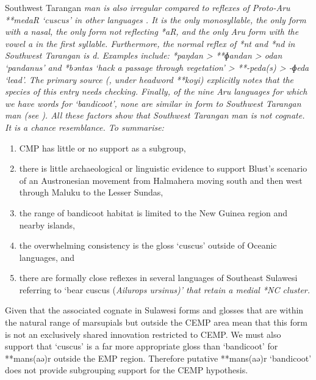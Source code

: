 Southwest Tarangan \it{man} is also irregular compared to reflexes
of Proto-Aru **medaR ‘cuscus’ in other  languages \citep[264]{Schapper2011}.
It is the only monosyllable,
the only form with a nasal,
the only form not reflecting *aR,
and the only Aru form with the vowel \it{a} in the first syllable.
Furthermore, the normal reflex of *nt and *nd in Southwest Tarangan is \it{d}.
Examples include: *paŋdan > **ɸandan > \it{odan} `pandanus' and
*bəntas `hack a passage through vegetation' > **-peda(s) > \it{-ɸeda} `lead'.
The primary source (\citealt{Nivens2017},
under headword **koyi) explicitly notes that the species of this entry needs checking.
Finally, of the nine Aru languages for which we have words
for ‘bandicoot’, none are similar in form to Southwest Tarangan \it{man} (see
).
All these factors show that Southwest Tarangan \it{man} is not cognate.
It is a chance resemblance.
To summarise:

\begin{enumerate}
	\item	CMP has little or no support as a subgroup,
	\item	there is little archaeological or linguistic evidence to
				support Blust’s scenario of an Austronesian movement from Halmahera
				moving south and then west through Maluku to the Lesser Sundas,
	\item	the range of bandicoot habitat is limited to the New Guinea
				region and nearby islands,
	\item	the overwhelming consistency is the
				gloss ‘cuscus’
				outside of Oceanic languages, and
	\item	there are formally close reflexes in several
				languages of Southeast Sulawesi referring to ‘bear cuscus (\it{Ailurops
				ursinus})’ that retain a medial *NC cluster.
\end{enumerate}

Given that the associated cognate in Sulawesi forms
and glosses that are within the natural range of marsupials but
outside the CEMP area mean that this form is not an exclusively
shared innovation restricted to CEMP.
We must also support \citet{Schapper2011} that ‘cuscus’ is a far
more appropriate gloss than ‘bandicoot’ for **mans(aə)r outside
the EMP region.
Therefore putative **mans(aə)r `bandicoot' does
not provide subgrouping support for
the CEMP hypothesis.